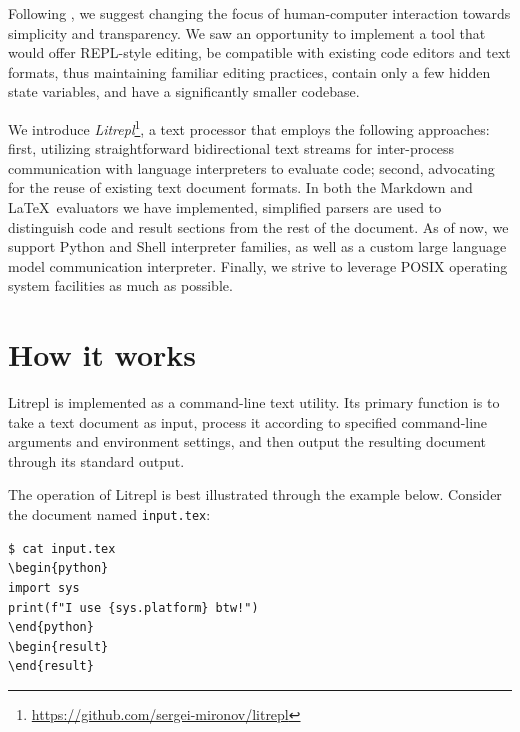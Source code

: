 \documentclass[letterpaper,12pt,twocolumn]{article}
\newcommand{\Latex}{\LaTeX\ }
\begin{document}
Following \textcite{Vallet2022}, we suggest changing the focus of human-computer
interaction towards simplicity and transparency. We saw an opportunity to
implement a tool that would offer REPL-style editing, be compatible with
existing code editors and text formats, thus maintaining familiar editing
practices, contain only a few hidden state variables, and have a significantly
smaller codebase.

We introduce
\textit{Litrepl}\footnote{\url{https://github.com/sergei-mironov/litrepl}},
a text processor that employs the following approaches: first, utilizing
straightforward bidirectional text streams for inter-process communication with
language interpreters to evaluate code; second, advocating for the reuse of
existing text document formats. In both the Markdown and \Latex evaluators we
have implemented, simplified parsers are used to distinguish code and result
sections from the rest of the document.  As of now, we support Python and Shell
interpreter families, as well as a custom large language model communication
interpreter. Finally, we strive to leverage POSIX\cite{POSIX2024} operating
system facilities as much as possible.

\section{How it works}

Litrepl is implemented as a command-line text utility. Its primary function is
to take a text document as input, process it according to specified command-line
arguments and environment settings, and then output the resulting document
through its standard output.

The operation of Litrepl is best illustrated through the example below. Consider
the document named \verb|input.tex|:

\begin{verbatim}
$ cat input.tex
\begin{python}
import sys
print(f"I use {sys.platform} btw!")
\end{python}
\begin{result}
\end{result}
\end{verbatim}
\end{document}
